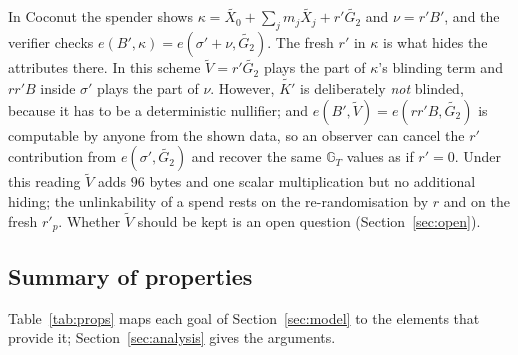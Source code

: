 \documentclass[10pt,a5paper]{article}
\newcommand{\K}[1]{#1}                      %
\newcommand{\Go}[1]{#1}                     %
\newcommand{\Gt}[1]{\tilde{#1}}             %
\newcommand{\K}[1]{{\color{ScalarCol}#1}}   %
\newcommand{\Go}[1]{{\color{GoneCol}#1}}    %
\newcommand{\Gt}[1]{{\color{GtwoCol}#1}}    %
\newcommand{\GG}[1]{\mathbb{G}_{#1}}
\begin{document}
In Coconut the spender shows $\kappa = \Gt{X_0} + \sum_j \K{m_j}\Gt{X_j} + \K{r'}\Gt{G_2}$
and $\nu = \K{r'}\Go{B'}$, and the verifier checks
$e(\Go{B'},\kappa) = e(\Go{\sigma'} + \nu, \Gt{G_2})$. The fresh $\K{r'}$ in
$\kappa$ is what hides the attributes there. In this scheme $\Gt{V} = \K{r'}\Gt{G_2}$
plays the part of $\kappa$'s blinding term and $\K{r}\K{r'}\Go{B}$ inside
$\Go{\sigma'}$ plays the part of $\nu$. However, $\Gt{K'}$ is deliberately
\emph{not} blinded, because it has to be a deterministic nullifier; and
$e(\Go{B'},\Gt{V}) = e(\K{r}\K{r'}\Go{B},\Gt{G_2})$ is computable by anyone from
the shown data, so an observer can cancel the $\K{r'}$ contribution from
$e(\Go{\sigma'},\Gt{G_2})$ and recover the same $\GG{T}$ values as if
$\K{r'} = 0$. Under this reading $\Gt{V}$ adds $96$ bytes and one scalar
multiplication but no additional hiding; the unlinkability of a spend rests on
the re-randomisation by $\K{r}$ and on the fresh $\K{r'_p}$. Whether $\Gt{V}$
should be kept is an open question (Section~\ref{sec:open}).

\subsection{Summary of properties}
\label{sec:security}

Table~\ref{tab:props} maps each goal of Section~\ref{sec:model} to the elements
that provide it; Section~\ref{sec:analysis} gives the arguments.
\end{document}

